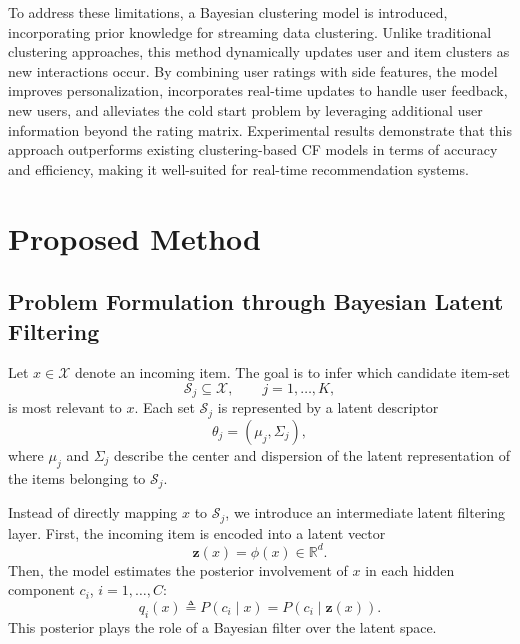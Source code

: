 \documentclass{article}
\begin{document}
To address these limitations, a Bayesian clustering model is introduced, incorporating prior knowledge for streaming data clustering. Unlike traditional clustering approaches, this method dynamically updates user and item clusters as new interactions occur. By combining user ratings with side features, the model improves personalization, incorporates real-time updates to handle user feedback, new users, and alleviates the cold start problem by leveraging additional user information beyond the rating matrix. Experimental results demonstrate that this approach outperforms existing clustering-based CF models in terms of accuracy and efficiency, making it well-suited for real-time recommendation systems. 



















\section{Proposed Method}
\label{sec:proposed_method}




\subsection{Problem Formulation through Bayesian Latent Filtering}
\label{subsec:bayesian_latent_filtering}

Let \(x\in\mathcal{X}\) denote an incoming item. The goal is to infer which candidate item-set
\[
\mathcal{S}_j\subseteq\mathcal{X},\qquad j=1,\ldots,K,
\]
is most relevant to \(x\). Each set \(\mathcal{S}_j\) is represented by a latent descriptor
\[
\theta_j=(\mu_j,\Sigma_j),
\]
where \(\mu_j\) and \(\Sigma_j\) describe the center and dispersion of the latent representation of the items belonging to \(\mathcal{S}_j\).

Instead of directly mapping \(x\) to \(\mathcal{S}_j\), we introduce an intermediate latent filtering layer. First, the incoming item is encoded into a latent vector
\[
\mathbf{z}(x)=\phi(x)\in\mathbb{R}^{d}.
\]
Then, the model estimates the posterior involvement of \(x\) in each hidden component \(c_i\), \(i=1,\ldots,C\):
\[
q_i(x)
\triangleq
P(c_i\mid x)
=
P(c_i\mid \mathbf{z}(x)).
\]
This posterior plays the role of a Bayesian filter over the latent space.
\end{document}
